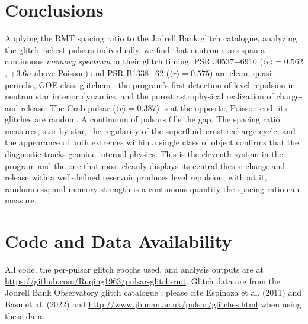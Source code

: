 \documentclass[12pt,a4paper]{article}
\begin{document}
\section{Conclusions}

Applying the RMT spacing ratio to the Jodrell Bank glitch catalogue, analyzing the glitch-richest pulsars individually, we find that neutron stars span a continuous \emph{memory spectrum} in their glitch timing. PSR J0537$-$6910 ($\langle r\rangle=0.562$, $+3.6\sigma$ above Poisson) and PSR B1338$-$62 ($\langle r\rangle=0.575$) are clean, quasi-periodic, GOE-class glitchers---the program's first detection of level repulsion in neutron star interior dynamics, and the purest astrophysical realization of charge-and-release. The Crab pulsar ($\langle r\rangle=0.387$) is at the opposite, Poisson end: its glitches are random. A continuum of pulsars fills the gap. The spacing ratio measures, star by star, the regularity of the superfluid--crust recharge cycle, and the appearance of both extremes within a single class of object confirms that the diagnostic tracks genuine internal physics. This is the eleventh system in the program and the one that most cleanly displays its central thesis: charge-and-release with a well-defined reservoir produces level repulsion; without it, randomness; and memory strength is a continuous quantity the spacing ratio can measure.

\section*{Code and Data Availability}
All code, the per-pulsar glitch epochs used, and analysis outputs are at \url{https://github.com/Ruqing1963/pulsar-glitch-rmt}. Glitch data are from the Jodrell Bank Observatory glitch catalogue \citep{basu2022}; please cite Espinoza et al. (2011) and Basu et al. (2022) and \url{http://www.jb.man.ac.uk/pulsar/glitches.html} when using these data.
\end{document}
